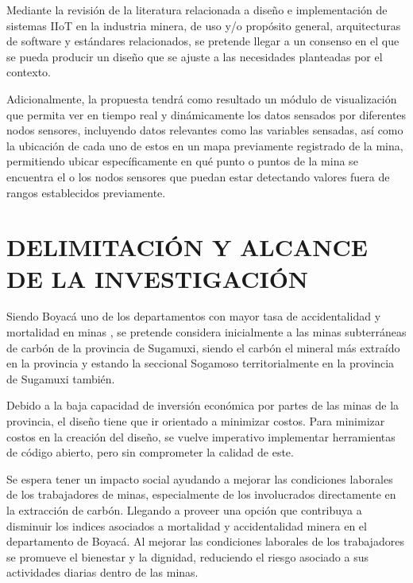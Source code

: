 \documentclass[stu,12pt,floatsintext]{apa7}
\begin{document}
		Mediante la revisión de la literatura relacionada a diseño e implementación de sistemas IIoT en la industria minera, de uso y/o propósito general, arquitecturas de software y estándares relacionados, se pretende llegar a un consenso en el que se pueda producir un diseño que se ajuste a las necesidades planteadas por el contexto.
		
		Adicionalmente, la propuesta tendrá como resultado un módulo de visualización que permita ver en tiempo real y dinámicamente los datos sensados por diferentes nodos sensores, incluyendo datos relevantes como las variables sensadas, así como la ubicación de cada uno de estos en un mapa previamente registrado de la mina, permitiendo ubicar específicamente en qué punto o puntos de la mina se encuentra el o los nodos sensores que puedan estar detectando valores fuera de rangos establecidos previamente. 
		
		
	\section{DELIMITACIÓN Y ALCANCE DE LA INVESTIGACIÓN}
	Siendo Boyacá uno de los departamentos con mayor tasa de accidentalidad y mortalidad en minas \cite{anm2020}, se pretende considera inicialmente a las minas subterráneas de carbón de la provincia de Sugamuxi, siendo el carbón el mineral más extraído en la provincia y estando la seccional Sogamoso territorialmente en la provincia de Sugamuxi también.
	
	Debido a la baja capacidad de inversión económica por partes de las minas de la provincia, el diseño tiene que ir orientado a minimizar costos.
	Para minimizar costos en la creación del diseño, se vuelve imperativo implementar herramientas de código abierto, pero sin comprometer la calidad de este.
	
	Se espera tener un impacto social ayudando a mejorar las condiciones laborales de los trabajadores de minas, especialmente de los involucrados directamente en la extracción de carbón. Llegando a proveer una opción que contribuya a disminuir los indices asociados a mortalidad  y accidentalidad 	minera en el departamento de Boyacá.
	Al mejorar las condiciones laborales de los trabajadores se promueve el bienestar y la dignidad, reduciendo el riesgo asociado a sus actividades diarias dentro de las minas.
	
\end{document}
